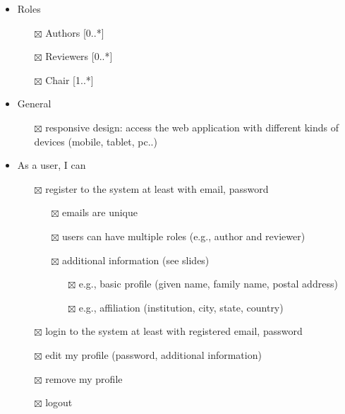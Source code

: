 \documentclass[nochapterpage,nopartpage,noheadingspace,numbersubsubsec,bigchapter,colorback,accentcolor=tud9c,10pt]{tudreport}
\begin{document}
        \begin{itemize}
            \setlength\itemsep{0em}
            \item Roles
            \begin{itemize}
                \item[$\boxtimes$] Authors [0..*]
                \item[$\boxtimes$] Reviewers [0..*]
                \item[$\boxtimes$] Chair [1..*]
            \end{itemize}

            \item General
            \begin{itemize}
                \item[$\boxtimes$] responsive design: access the web application with different kinds of devices (mobile, tablet, pc..)
            \end{itemize}

            \item As a user, I can
            \begin{itemize}
                \item[$\boxtimes$] register to the system at least with email, password
                \begin{itemize}
                    \item[$\boxtimes$] emails are unique
                    \item[$\boxtimes$] users can have multiple roles (e.g., author and reviewer)
                    \item[$\boxtimes$] additional information (see slides)
                    \begin{itemize}
                        \item[$\boxtimes$] e.g., basic profile (given name, family name, postal address)
                        \item[$\boxtimes$] e.g., affiliation (institution, city, state, country)
                    \end{itemize}
                \end{itemize}
                \item[$\boxtimes$] login to the system at least with registered email, password
                \item[$\boxtimes$] edit my profile (password, additional information)
                \item[$\boxtimes$] remove my profile
                \item[$\boxtimes$] logout
            \end{itemize}


\end{itemize}
\end{document}
